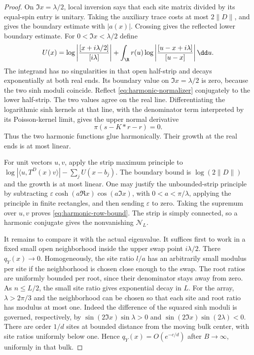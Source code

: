 \begin{proof}
On $\Im x=\lambda/2$, local inversion says that each site matrix
divided by its equal-spin entry is unitary.  Taking the auxiliary
trace costs at most $2\|D\|$, and gives the boundary estimate with
$|a(x)|$.  Crossing gives the reflected lower boundary estimate.
For $0<\Im x<\lambda/2$ define
\begin{equation}\label{eq:harmonic-normalizer}
 U(x)=\log\left|\frac{[x+i\lambda/2]}{[i\lambda]}\right|
       +\int_\R r(u)
            \log\left|\frac{[u-x+i\lambda]}{[u-x]}\right|\dd u.
\end{equation}
The integrand has no singularities in that open half-strip and
decays exponentially at both real ends.  Its boundary value on
$\Im x=\lambda/2$ is zero, because the two sinh moduli coincide.
Reflect \eqref{eq:harmonic-normalizer} conjugately to the lower
half-strip.  The two values agree on the real line.  Differentiating
the logarithmic sinh kernels at that line, with the denominator
term interpreted by its Poisson-kernel limit, gives the upper
normal derivative
\[
 \pi(s-K*r-r)=0.
\]
Thus the two harmonic functions glue harmonically.  Their growth
at the real ends is at most linear.

For unit vectors $u,v$, apply the strip maximum principle to
$\log|\langle u,T^D(x)v\rangle|-\sum_jU(x-b_j)$.
The boundary bound is $\log(2\|D\|)$ and the growth is at most
linear.  One may justify the unbounded-strip principle by subtracting
$\varepsilon\cosh(a\Re x)\cos(a\Im x)$, with
$0<a<\pi/\lambda$, applying the principle in finite rectangles,
and then sending $\varepsilon$ to zero.
Taking the supremum over $u,v$ proves
\eqref{eq:harmonic-row-bound}.  The strip is simply connected, so
a harmonic conjugate gives the nonvanishing $\mathcal N_L$.

It remains to compare it with the actual eigenvalue.
It suffices first to work in a fixed small open neighborhood inside
the upper swap point $i\lambda/2$.
There $q_Y(x)\to0$.  Homogeneously, the site ratio $l/a$ has an
arbitrarily small modulus per site if the neighborhood is chosen
close enough to the swap.  The root ratios are uniformly bounded
per root, since their denominator stays away from zero.
As $n\le L/2$, the small site ratio gives exponential decay in $L$.
For the array, $\lambda>2\pi/3$ and the neighborhood can be chosen
so that each site and root ratio has modulus at most one.
Indeed the difference of the squared sinh moduli is governed,
respectively, by $\sin(2\Im x)\sin\lambda>0$ and
$\sin(2\Im x)\sin(2\lambda)<0$.
There are order $1/d$ sites at bounded distance from the moving
bulk center, with site ratios uniformly below one.  Hence
$q_Y(x)=O(e^{-c/d})$ after $B\to\infty$, uniformly in that bulk.


\end{proof}

